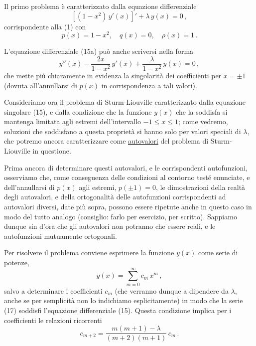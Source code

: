 \documentclass[11pt, a4paper]{book}
\numberwithin{equation}{section}
\begin{document}
Il primo problema è caratterizzato dalla equazione differenziale
\begin{equation}
\left[(1-x^2)\,y'(x)\right]'+\lambda\,y(x)=0\,, \tag{15a}
\end{equation}
corrispondente alla (1) con
\begin{equation}
p(x)=1-x^2,\quad q(x)=0,\quad\rho(x)=1\,. \tag{16}
\end{equation}

L'equazione differenziale (15a) può anche scriversi nella forma
\begin{equation}
y''(x)-\frac{2x}{1-x^2}\,y'(x)+\frac{\lambda}{1-x^2}\,y(x)=0\,, \tag{15b}
\end{equation}
che mette più chiaramente in evidenza la singolarità dei coefficienti per $x=\pm 1$ (dovuta all'annullarsi di $p(x)$ in corrispondenza a tali valori).

Consideriamo ora il problema di Sturm-Liouville caratterizzato dalla equazione singolare (15), e dalla condizione che la funzione $y(x)$ che la soddisfa si mantenga limitata agli estremi dell'intervallo $-1\leq x\leq 1$; come vedremo, soluzioni che soddisfano a questa proprietà si hanno solo per valori speciali di $\lambda$, che potremo ancora caratterizzare come \underline{autovalori} del problema di Sturm-Liouville in questione.

Prima ancora di determinare questi autovalori, e le corrispondenti autofunzioni, osserviamo che, come conseguenza delle condizioni al contorno testé enunciate, e dell'annullarsi di $p(x)$ agli estremi, $p(\pm 1)=0$, le dimostrazioni della realtà degli autovalori, e della ortogonalità delle autofunzioni corrispondenti ad autovalori diversi, date più sopra, possono essere ripetute anche in questo caso in modo del tutto analogo (consiglio: farlo per esercizio, per scritto). Sappiamo dunque sin d'ora che gli autovalori non potranno che essere reali, e le autofunzioni mutuamente ortogonali.

Per risolvere il problema conviene esprimere la funzione $y(x)$ come serie di potenze,
\begin{equation}
y(x)=\sum_{m=0}^{\infty}c_m\,x^m\,, \tag{17}
\end{equation}
salvo a determinare i coefficienti $c_m$ (che verranno dunque a dipendere da $\lambda$, anche se per semplicità non lo indichiamo esplicitamente) in modo che la serie (17) soddisfi l'equazione differenziale (15). Questa condizione implica per i coefficienti le relazioni ricorrenti
\[
c_{m+2} = \frac{m(m+1)-\lambda}{(m+2)(m+1)}\, c_m \,. \tag{18}
\]
\end{document}
